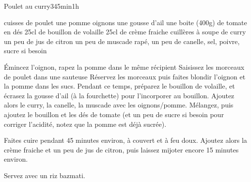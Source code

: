 \begin{recette}{Poulet au curry}{3}{45min}{1h}

\begin{ingredients}
 cuisses de poulet
\ingredient une pomme
 oignons
\ingredient une gousse d'ail
\ingredient une boite (400g) de tomate en dés 
\ingredient 25cl de bouillon de volaille
\ingredient 25cl de crème fraiche
 cuillères à soupe de curry
\ingredient un peu de jus de citron
\ingredient un peu de muscade rapé, un peu de canelle, sel, poivre, sucre si besoin
\end{ingredients}

\begin{preparation}
\etape Émincez l'oignon, rapez la pomme dans le même récipient
\etape Saisissez les morceaux de poulet dans une sauteuse
\etape Réservez les morceaux puis faites blondir l'oignon et la pomme dans les sucs.
\etape Pendant ce temps, préparez le bouillon de volaille, et écrasez la gousse d'ail (à la fourchette) pour l'incorporer au 
bouillon.
\etape Ajoutez alors le curry, la canelle, la muscade avec les oignons/pomme. Mélangez, puis ajoutez le bouillon et les dés de 
tomate (et un peu de sucre si besoin pour corriger l'acidité, notez que la pomme est déjà sucrée). 
\end{preparation}

\begin{cuisson}
Faites cuire pendant 45 minutes environ, à couvert et à feu doux. Ajoutez alors la crème fraiche et un peu de jus 
de citron, puis laissez mijoter encore 15 minutes environ. 

Servez avec un riz bazmati.
\end{cuisson}
\end{recette}

